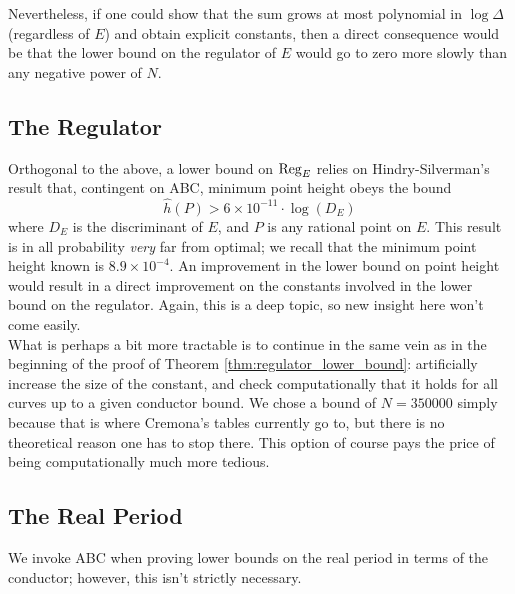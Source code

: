 Nevertheless, if one could show that the sum grows at most polynomial in $\log \Delta$ (regardless of $E$) and obtain explicit constants, then a direct consequence would be that the lower bound on the regulator of $E$ would go to zero more slowly than any negative power of $N$. \\

\subsection{The Regulator}

Orthogonal to the above, a lower bound on $\operatorname{Reg}_E$ relies on Hindry-Silverman's \cite{HiS-1988} result that, contingent on ABC, minimum point height obeys the bound
\begin{equation}
\hat{h}(P) > 6\times 10^{-11}\cdot \log(D_E)
\end{equation}
where $D_E$ is the discriminant of $E$, and $P$ is any rational point on $E$. This result is in all probability {\it very} far from optimal; we recall that the minimum point height known is $8.9\times 10^{-4}$. An improvement in the lower bound on point height would result in a direct improvement on the constants involved in the lower bound on the regulator. Again, this is a deep topic, so new insight here won't come easily. \\

What is perhaps a bit more tractable is to continue in the same vein as in the beginning of the proof of Theorem \ref{thm:regulator_lower_bound}: artificially increase the size of the constant, and check computationally that it holds for all curves up to a given conductor bound. We chose a bound of $N=350000$ simply because that is where Cremona's tables currently go to, but there is no theoretical reason one has to stop there. This option of course pays the price of being computationally much more tedious. \\

\subsection{The Real Period}

We invoke ABC when proving lower bounds on the real period in terms of the conductor; however, this isn't strictly necessary.